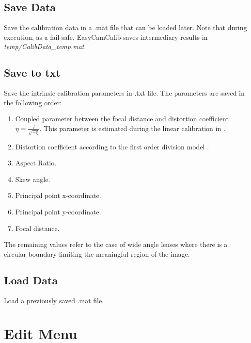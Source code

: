 \documentclass[article,11pt]{memoir}
\begin{document}
\subsection{Save Data}
Save the calibration data in a .mat file that can be loaded later. Note that during execution, as a fail-safe, EasyCamCalib saves intermediary results in \textit{temp/CalibData\_temp.mat}. 

\subsection{Save to txt}
Save the intrinsic calibration parameters in .txt file. The parameters are saved in the following order:
\begin{enumerate}
\item Coupled parameter between the focal distance and distortion coefficient $\eta=\frac{f}{\sqrt{-\xi}}$. This parameter is estimated during the linear calibration in \cite{barreto_09}.
\item Distortion coefficient according to the first order division model \cite{divmodel,amarelo}.
\item Aspect Ratio.
\item Skew angle.
\item Principal point x-coordinate.
\item Principal point y-coordinate.
\item Focal distance.
\end{enumerate}
The remaining values refer to the case of wide angle lenses where there is a circular boundary limiting the meaningful region of the image. 

\subsection{Load Data}
Load a previously saved .mat file.


\section{Edit Menu}
\end{document}

